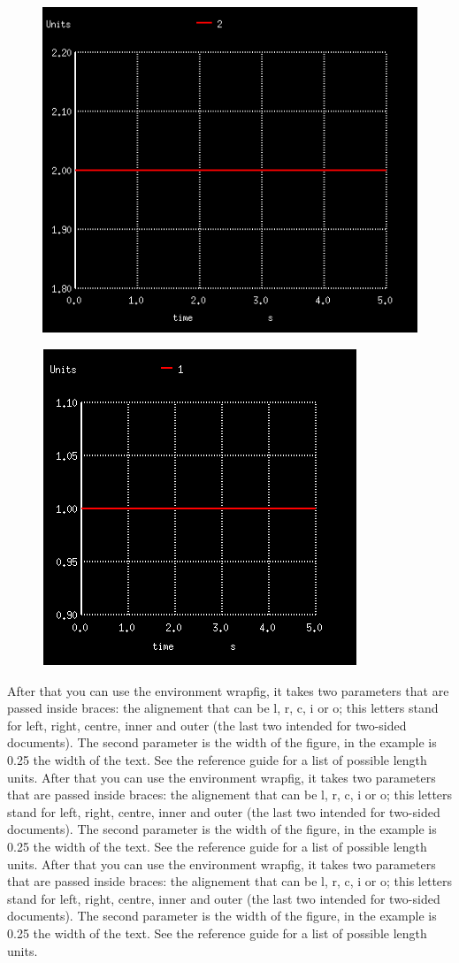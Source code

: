\documentclass{report}
\begin{document}
 
 \begin{figure}[b]
\centering
\begin{minipage}{.5\textwidth}
  \centering
  \includegraphics[width=.4\linewidth]{Figures/oneFig.png}
  \label{fig:test8}
\end{minipage}%
\begin{minipage}{.5\textwidth}
  \centering
  \includegraphics[width=.4\linewidth]{Figures/twoFig.png}
  \label{fig:test7}
\end{minipage}
\end{figure}


 


 After that you can use the environment wrapfig, it takes two parameters that are passed inside braces: the alignement that can be l, r, c, i or o; this letters stand for left, right, centre, inner and outer (the last two intended for two-sided documents). The second parameter is the width of the figure, in the example is 0.25 the width of the text. See the reference guide for a list of possible length units.
 After that you can use the environment wrapfig, it takes two parameters that are passed inside braces: the alignement that can be l, r, c, i or o; this letters stand for left, right, centre, inner and outer (the last two intended for two-sided documents). The second parameter is the width of the figure, in the example is 0.25 the width of the text. See the reference guide for a list of possible length units.
 After that you can use the environment wrapfig, it takes two parameters that are passed inside braces: the alignement that can be l, r, c, i or o; this letters stand for left, right, centre, inner and outer (the last two intended for two-sided documents). The second parameter is the width of the figure, in the example is 0.25 the width of the text. See the reference guide for a list of possible length units. \cite{firstRef,thirdRef}
\end{document}
